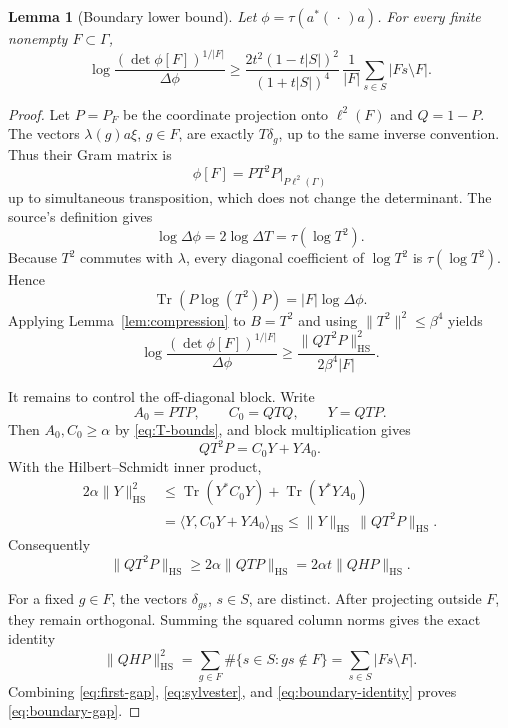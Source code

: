 \documentclass[11pt]{article}
\newtheorem{lemma}[theorem]{Lemma}
\newcommand{\G}{\Gamma}
\newcommand{\Tr}{\operatorname{Tr}}
\newcommand{\HS}{\mathrm{HS}}
\begin{document}
\begin{lemma}[Boundary lower bound]\label{lem:boundary}
Let $\phi=\tau(a^*(\,\cdot\,)a)$.  For every finite nonempty
$F\subset\G$,
\begin{equation}\label{eq:boundary-gap}
 \log\frac{(\det\phi[F])^{1/|F|}}{\Delta\phi}
 \geq
 \frac{2t^2(1-t|S|)^2}{(1+t|S|)^4}\,
 \frac1{|F|}\sum_{s\in S}|Fs\setminus F|.
\end{equation}
\end{lemma}

\begin{proof}
Let $P=P_F$ be the coordinate projection onto $\ell^2(F)$ and $Q=1-P$.
The vectors $\lambda(g)a\xi$, $g\in F$, are exactly $T\delta_g$, up to the
same inverse convention.  Thus their Gram matrix is
\begin{equation}\label{eq:gram-compression}
 \phi[F]=P T^2P\big|_{P\ell^2(\G)}
\end{equation}
up to simultaneous transposition, which does not change the determinant.
The source's definition gives
\begin{equation}\label{eq:delta-normalization}
 \log\Delta\phi=2\log\Delta T=\tau(\log T^2).
\end{equation}
Because $T^2$ commutes with $\lambda$, every diagonal coefficient of
$\log T^2$ is $\tau(\log T^2)$.  Hence
\[
 \Tr(P\log(T^2)P)=|F|\log\Delta\phi.
\]
Applying Lemma~\ref{lem:compression} to $B=T^2$ and using
$\|T^2\|^2\leq\beta^4$ yields
\begin{equation}\label{eq:first-gap}
 \log\frac{(\det\phi[F])^{1/|F|}}{\Delta\phi}
 \geq \frac{\|QT^2P\|_{\HS}^2}{2\beta^4|F|}.
\end{equation}

It remains to control the off-diagonal block.  Write
\[
 A_0=PTP,\qquad C_0=QTQ,\qquad Y=QTP.
\]
Then $A_0,C_0\geq\alpha$ by \eqref{eq:T-bounds}, and block multiplication
gives
\[
 QT^2P=C_0Y+YA_0.
\]
With the Hilbert--Schmidt inner product,
\begin{align*}
 2\alpha\|Y\|_{\HS}^2
 &\leq \Tr(Y^*C_0Y)+\Tr(Y^*YA_0)\\
 &=\langle Y,C_0Y+YA_0\rangle_{\HS}
 \leq \|Y\|_{\HS}\,\|QT^2P\|_{\HS}.
\end{align*}
Consequently
\begin{equation}\label{eq:sylvester}
 \|QT^2P\|_{\HS}\geq2\alpha\|QTP\|_{\HS}
 =2\alpha t\|QHP\|_{\HS}.
\end{equation}

For a fixed $g\in F$, the vectors $\delta_{gs}$, $s\in S$, are distinct.
After projecting outside $F$, they remain orthogonal.  Summing the squared
column norms gives the exact identity
\begin{equation}\label{eq:boundary-identity}
 \|QHP\|_{\HS}^2
 =\sum_{g\in F}\#\{s\in S:gs\notin F\}
 =\sum_{s\in S}|Fs\setminus F|.
\end{equation}
Combining \eqref{eq:first-gap}, \eqref{eq:sylvester}, and
\eqref{eq:boundary-identity} proves \eqref{eq:boundary-gap}.
\end{proof}
\end{document}
